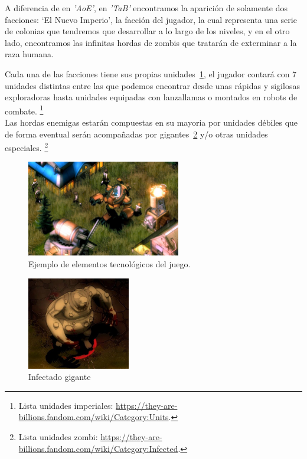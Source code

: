 A diferencia de en \textit{'\ac{AoE}'}, en \textit{'\ac{TaB}'} encontramos la aparición de solamente dos facciones:
`El Nuevo Imperio', la facción del jugador, la cual representa una 
serie de colonias que tendremos que desarrollar a lo largo de los niveles, y en el otro lado, 
encontramos las infinitas hordas de zombis que tratarán de exterminar a la raza humana.

Cada una de las facciones tiene sus propias unidades~\ref{img:tab_2}, el jugador contará con 7 unidades distintas
entre las que podemos encontrar desde unas rápidas y sigilosas exploradoras hasta unidades equipadas
con lanzallamas o montados en robots de combate. \footnote{Lista unidades imperiales: \url{https://they-are-billions.fandom.com/wiki/Category:Units}.}
\\Las hordas enemigas estarán compuestas en su mayoria por unidades débiles que de forma eventual
serán acompañadas por gigantes~\ref{img:tab_3} y/o otras unidades especiales.
\footnote{Lista unidades zombi: \url{https://they-are-billions.fandom.com/wiki/Category:Infected}.}

\begin{figure}[ht]
\centering
\includegraphics[width=0.6\textwidth]{imagenes/marco_teo/referentes/tab_2.png}
\caption{Ejemplo de elementos tecnológicos del juego.}
\label{img:tab_2}
\end{figure}

\begin{figure}[ht]
\centering
\includegraphics[width=0.4\textwidth]{imagenes/marco_teo/referentes/tab_3.png}
\caption{Infectado gigante}
\label{img:tab_3}
\end{figure}

